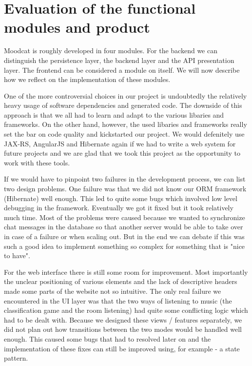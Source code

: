 
\chapter{Evaluation of the functional modules and product}

Moodcat is roughly developed in four modules.
For the backend we can distinguish the persistence layer, the backend layer and the API presentation layer.
The frontend can be considered a module on itself.
We will now describe how we reflect on the implementation of these modules.

One of the more controversial choices in our project is undoubtedly the relatively heavy usage of software dependencies and generated code.
The downside of this approach is that we all had to learn and adapt to the various libaries and frameworks.
On the other hand, however, the used libaries and frameworks really set the bar on code quality and kickstarted our project.
We would defenitely use JAX-RS, AngularJS and Hibernate again if we had to write a web system for future projects and we are glad that we took this project as the opportunity to work with these tools.

If we would have to pinpoint two failures in the development process, we can list two design problems.
One failure was that we did not know our ORM framework (Hibernate) well enough.
This led to quite some bugs which involved low level debugging in the framework.
Eventually we got it fixed but it took relatively much time.
Most of the problems were caused because we wanted to synchronize chat messages in the database so that another server would be able to take over in case of a failure or when scaling out.
But in the end we can debate if this was such a good idea to implement something so complex for something that is "nice to have".

For the web interface there is still some room for improvement.
Most importantly the unclear positioning of various elements and the lack of descriptive headers made some parts of the website not so intuitive.
The only real failure we encountered in the UI layer was that the two ways of listening to music (the classification game and the room listening) had quite some conflicting logic which had to be dealt with.
Because we designed these views / features separately, we did not plan out how transitions between the two modes would be handled well enough.
This caused some bugs that had to resolved later on and the implementation of these fixes can still be improved using, for example - a state pattern.

